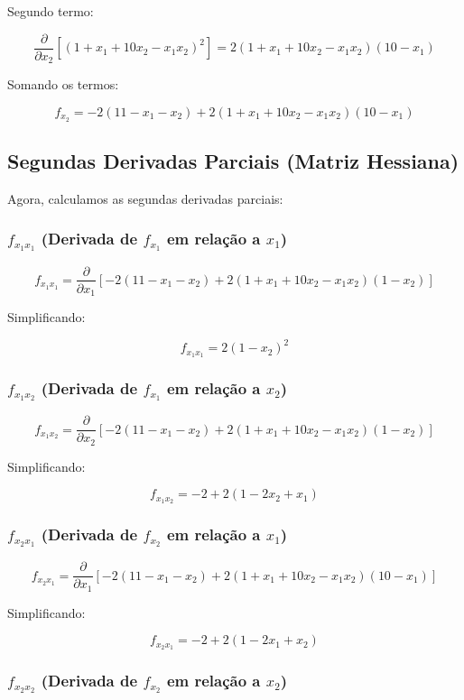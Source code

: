\documentclass[a4paper, 12pt]{article}
\begin{document}
Segundo termo:

\[
\frac{\partial}{\partial x_2} \left[(1 + x_1 + 10x_2 - x_1x_2)^2\right] = 2(1 + x_1 + 10x_2 - x_1x_2)(10 - x_1)
\]

Somando os termos:

\[
f_{x_2} = -2(11 - x_1 - x_2) + 2(1 + x_1 + 10x_2 - x_1x_2)(10 - x_1)
\]

\subsection{Segundas Derivadas Parciais (Matriz Hessiana)}

Agora, calculamos as segundas derivadas parciais:

\subsubsection{\( f_{x_1x_1} \) (Derivada de \( f_{x_1} \) em relação a \( x_1 \))}

\[
f_{x_1x_1} = \frac{\partial}{\partial x_1} \left[-2(11 - x_1 - x_2) + 2(1 + x_1 + 10x_2 - x_1x_2)(1 - x_2)\right]
\]

Simplificando:

\[
f_{x_1x_1} = 2(1 - x_2)^2
\]

\subsubsection{\( f_{x_1x_2} \) (Derivada de \( f_{x_1} \) em relação a \( x_2 \))}

\[
f_{x_1x_2} = \frac{\partial}{\partial x_2} \left[-2(11 - x_1 - x_2) + 2(1 + x_1 + 10x_2 - x_1x_2)(1 - x_2)\right]
\]

Simplificando:

\[
f_{x_1x_2} = -2 + 2(1 - 2x_2 + x_1)
\]

\subsubsection{\( f_{x_2x_1} \) (Derivada de \( f_{x_2} \) em relação a \( x_1 \))}

\[
f_{x_2x_1} = \frac{\partial}{\partial x_1} \left[-2(11 - x_1 - x_2) + 2(1 + x_1 + 10x_2 - x_1x_2)(10 - x_1)\right]
\]

Simplificando:

\[
f_{x_2x_1} = -2 + 2(1 - 2x_1 + x_2)
\]

\subsubsection{\( f_{x_2x_2} \) (Derivada de \( f_{x_2} \) em relação a \( x_2 \))}
\end{document}
